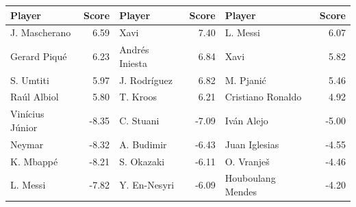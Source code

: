 
\begin{tabular}{lrlrlr}
\toprule
Player & Score & Player & Score & Player & Score\\
\midrule
J. Mascherano & 6.59 & Xavi & 7.40 & L. Messi & 6.07\\
Gerard Piqué & 6.23 & Andrés Iniesta & 6.84 & Xavi & 5.82\\
S. Umtiti & 5.97 & J. Rodríguez & 6.82 & M. Pjanić & 5.46\\
Raúl Albiol & 5.80 & T. Kroos & 6.21 & Cristiano Ronaldo & 4.92\\
Vinícius Júnior & -8.35 & C. Stuani & -7.09 & Iván Alejo & -5.00\\
Neymar & -8.32 & A. Budimir & -6.43 & Juan Iglesias & -4.55\\
K. Mbappé & -8.21 & S. Okazaki & -6.11 & O. Vranješ & -4.46\\
L. Messi & -7.82 & Y. En-Nesyri & -6.09 & Houboulang Mendes & -4.20\\
\bottomrule
\end{tabular}
